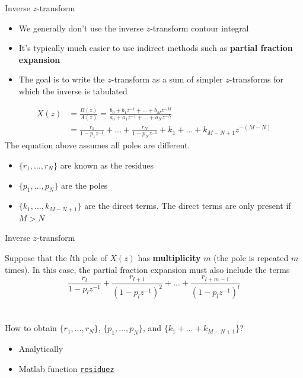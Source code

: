 \documentclass[10pt]{beamer}
\begin{document}
%
\begin{frame}{Inverse $z$-transform}
\begin{itemize}
	\item We generally don't use the inverse $z$-transform contour integral
	\item It's typically much easier to use indirect methods such as \textbf{partial fraction expansion}
	\item The goal is to write the $z$-transform as a sum of simpler $z$-transforms for which the inverse is tabulated
\end{itemize}
\vspace{-0.25cm}
\begin{align*}
X(z) &= \frac{B(z)}{A(z)} = \frac{b_0 + b_1z^{-1}+\ldots+b_Mz^{-M}}{a_0 + a_1z^{-1}+\ldots+a_Nz^{-N}} \tag{$z$-transform we want to invert} \\
&= \frac{r_1}{1-p_1z^{-1}} + \ldots + \frac{r_N}{1-p_Nz^{-1}} + k_1 + \ldots + k_{M-N+1}z^{-(M-N)} \tag{sum of simpler $z$-transforms}
\end{align*}
The equation above assumes all poles are different.

\begin{itemize}
	\item $\{r_1,\ldots,r_N\}$ are known as the residues
	\item $\{p_1,\ldots,p_N\}$ are the poles
	\item $\{k_1, \ldots, k_{M-N+1}\}$ are the direct terms. The direct terms are only present if $M > N$
\end{itemize}

\end{frame}

%
\begin{frame}{Inverse $z$-transform}

Suppose that the $l$th pole of $X(z)$ has \textbf{multiplicity} $m$ (the pole is repeated $m$ times). In this case, the partial fraction expansion must also include the terms
~\\

\begin{equation*}
\frac{r_l}{1-p_lz^{-1}} + \frac{r_{l+1}}{(1-p_lz^{-1})^2} + \ldots + \frac{r_{l+m-1}}{(1-p_lz^{-1})^l}
\end{equation*}
~\\
~\\
How to obtain $\{r_1,\ldots,r_N\}$, $\{p_1,\ldots,p_N\}$, and $\{k_1 + \ldots + k_{M-N+1}\}$?
\begin{itemize}
	\item Analytically
	\item Matlab function \href{https://www.mathworks.com/help/signal/ref/residuez.html}{\texttt{residuez}}
\end{itemize}

\end{frame}
\end{document}

